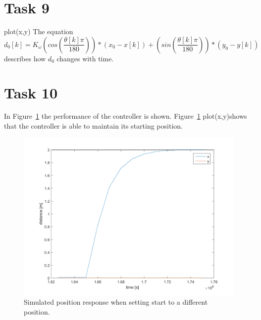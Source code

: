 \documentclass[a4paper,12pt,oneside,onecolumn]{article} %
\begin{document}
\section*{Task 9}
plot(x,y)
 	The equation 
	\begin{equation}
		d_0[k] = K_\omega(cos(\frac{\theta[k]\pi}{180}))*(x_0-x[k]) + (sin(\frac{\theta[k]\pi}{180}))*(y_0-y[k])
	\end{equation}
 	describes how $d_0$ changes with time.
\section*{Task 10}
In Figure~\ref{fig:task10_stepplot} the performance of the controller is shown.
Figure~\ref{fig:task10_stepplot} plot(x,y)shows that the controller is able to maintain
its starting position.  \begin{figure}[H]
        \centering
        \includegraphics[scale = 0.5]{../matlab/images/task10_stepplot.png}
        \caption{Simulated position response when setting start to a different position.}
        \label{fig:task10_stepplot}
    \end{figure}
    
\end{document}
